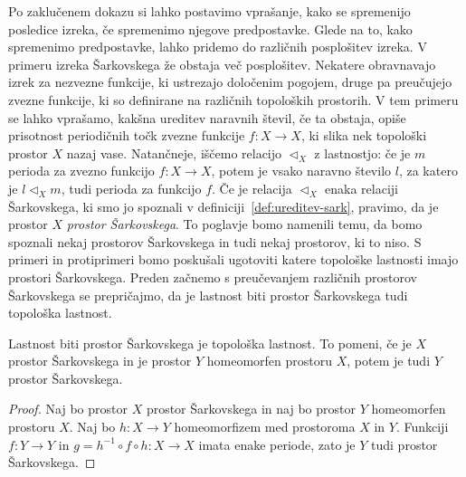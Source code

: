 \documentclass[../TG_magistrsko_delo_sections.tex]{subfiles}
\begin{document}
Po zaklučenem dokazu si lahko postavimo vprašanje, kako se spremenijo posledice izreka, če spremenimo njegove predpostavke. Glede na to, kako spremenimo predpostavke, lahko pridemo do različnih posplošitev izreka. V primeru izreka Šarkovskega že obstaja več posplošitev. Nekatere obravnavajo izrek za nezvezne funkcije, ki ustrezajo določenim pogojem, druge pa preučujejo zvezne funkcije, ki so definirane na različnih topoloških prostorih. V tem primeru se lahko vprašamo, kakšna ureditev naravnih števil, če ta obstaja, opiše prisotnost periodičnih točk zvezne funkcije $f:X \to X$, ki slika nek topološki prostor $X$ nazaj vase. Natančneje, iščemo relacijo $\triangleleft_X$ z lastnostjo: če je $m$ perioda za zvezno funkcijo $f:X \to X$, potem je vsako naravno število $l$, za katero je $l \triangleleft_X m$, tudi perioda za funkcijo $f$. Če je relacija $\triangleleft_X$ enaka relaciji Šarkovskega, ki smo jo spoznali v definiciji~\ref{def:ureditev-sark}, pravimo, da je prostor $X$ \emph{prostor Šarkovskega}. To poglavje bomo namenili temu, da bomo spoznali nekaj prostorov Šarkovskega in tudi nekaj prostorov, ki to niso. S primeri in protiprimeri bomo poskušali ugotoviti katere topološke lastnosti imajo prostori Šarkovskega.
Preden začnemo s preučevanjem različnih prostorov Šarkovskega se prepričajmo, da je lastnost biti prostor Šarkovskega tudi topološka lastnost. 
\begin{trditev}
Lastnost biti prostor Šarkovskega je topološka lastnost. To pomeni, če je $X$ prostor Šarkovskega in je prostor $Y$ homeomorfen prostoru $X$, potem je tudi $Y$ prostor Šarkovskega.
\end{trditev}
\begin{proof}
Naj bo prostor $X$ prostor Šarkovskega in naj bo prostor $Y$ homeomorfen prostoru $X$. Naj bo $h : X \to Y$ homeomorfizem med prostoroma $X$ in $Y$. Funkciji $f : Y \to Y$ in $g = h^{-1} \circ f \circ h : X \to X$ imata enake periode, zato je $Y$ tudi prostor Šarkovskega.
\end{proof}


\end{document}
